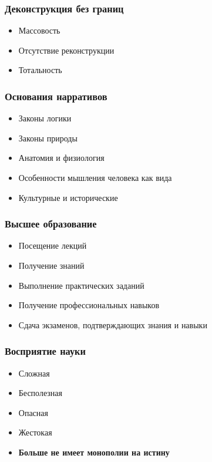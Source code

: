 \documentclass[aspectratio=169]{beamer}
\begin{document}
\begin{bframe}\frametitle{Деконструкция без границ}

\begin{itemize}
\item<+-> Массовость
\item<+-> Отсутствие реконструкции
\item<+-> Тотальность
\end{itemize}

\end{bframe}

\begin{bframe}\frametitle{Основания нарративов}
\begin{itemize}
\item<+-> Законы логики
\item<+-> Законы природы
\item<+-> Анатомия и физиология
\item<+-> Особенности мышления человека как вида
\item<+-> Культурные и исторические
\end{itemize}
\end{bframe}







\begin{bframe}\frametitle{Высшее образование}

\begin{itemize}
\item Посещение лекций 
\item Получение знаний
\item Выполнение практических заданий
\item Получение профессиональных навыков
\item Сдача экзаменов, подтверждающих знания и навыки
\end{itemize}

\end{bframe}

\begin{bframe}\frametitle{Восприятие науки}
\begin{itemize}
\item<+-> Сложная
\item<+-> Бесполезная
\item<+-> Опасная
\item<+-> Жестокая
\item<+-> {\bf Больше не имеет монополии на истину}
\end{itemize}

\end{bframe}
\end{document}
